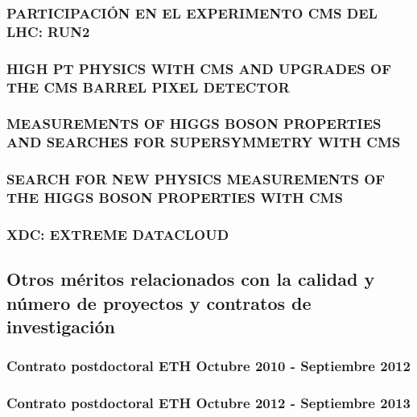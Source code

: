 \documentclass[a4paper, 11pt, twoside, openright]{report}
\begin{document}
\subsubsection{PARTICIPACIÓN EN EL EXPERIMENTO CMS DEL LHC: RUN2}


\subsubsection{HIGH PT PHYSICS WITH CMS AND UPGRADES OF THE CMS BARREL PIXEL DETECTOR}


\subsubsection{MEASUREMENTS OF HIGGS BOSON PROPERTIES AND SEARCHES FOR SUPERSYMMETRY WITH CMS}


\subsubsection{SEARCH FOR NEW PHYSICS MEASUREMENTS OF THE HIGGS BOSON PROPERTIES WITH CMS}


\subsubsection{XDC: EXTREME DATACLOUD}


\subsection{Otros méritos relacionados con la calidad y número de proyectos y contratos de investigación}

\subsubsection{Contrato postdoctoral ETH Octubre 2010 - Septiembre 2012}


\subsubsection{Contrato postdoctoral ETH Octubre 2012 - Septiembre 2013}

\end{document}
